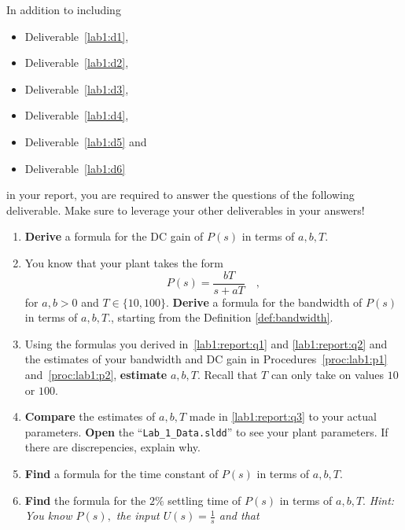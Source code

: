 In addition to including
\begin{itemize}
  \item{Deliverable~\ref{lab1:d1},}
  \item{Deliverable~\ref{lab1:d2},}
  \item{Deliverable~\ref{lab1:d3},}
  \item{Deliverable~\ref{lab1:d4},}
  \item{Deliverable~\ref{lab1:d5} and}
  \item{Deliverable~\ref{lab1:d6}}
\end{itemize}
in your report,
you are required to answer the questions of the following deliverable.
Make sure to leverage your other deliverables in your answers!
\begin{deliverable}[label={lab1:report}]
  \begin{enumerate}[label={(\arabic*)}]
    \item{
      \label{lab1:report:q1}
      \textbf{Derive} a formula for the DC gain of \(P(s)\) in terms of
      \(a, b, T.\)
    }
    \item{
      \label{lab1:report:q2}
      You know that your plant takes the form
      \[
        P(s) = \frac{b T}{s + a T}\quad ,
      \]
      for \(a, b > 0\) and \(T \in \{10, 100\}.\) \textbf{Derive} a
      formula for the bandwidth of \(P(s)\) in terms of \(a, b, T.\), starting from the Definition \ref{def:bandwidth}.
    }
    \item{
      \label{lab1:report:q3}
      Using the formulas you derived in~\ref{lab1:report:q1} and
      \ref{lab1:report:q2} and the estimates of your bandwidth and DC gain
      in Procedures~\ref{proc:lab1:p1} and~\ref{proc:lab1:p2},
      \textbf{estimate} \(a, b, T.\) Recall that \(T\) can only take on
      values \(10\) or \(100.\)
    }
    \item{
      \label{lab1:report:q4}
      \textbf{Compare} the estimates of \(a, b, T\) made in
      \ref{lab1:report:q3} to your actual parameters.
      \textbf{Open} the ``\texttt{Lab\_1\_Data.sldd}'' to see your plant
      parameters. If there are discrepencies, explain why.
    }
    \item{
      \label{lab1:report:q5}
      \textbf{Find} a formula for the time constant of \(P(s)\) in terms of \(a, b, T.\)
    }
    \item{
      \label{lab1:report:q6}
      \textbf{Find} the formula for the \(2\%\) settling time of \(P(s)\) in terms of \(a, b, T.\)
      \emph{Hint: You know \(P(s),\) the input \(U(s) = \frac{1}{s}\) and that
}}
\end{enumerate}
\end{deliverable}
